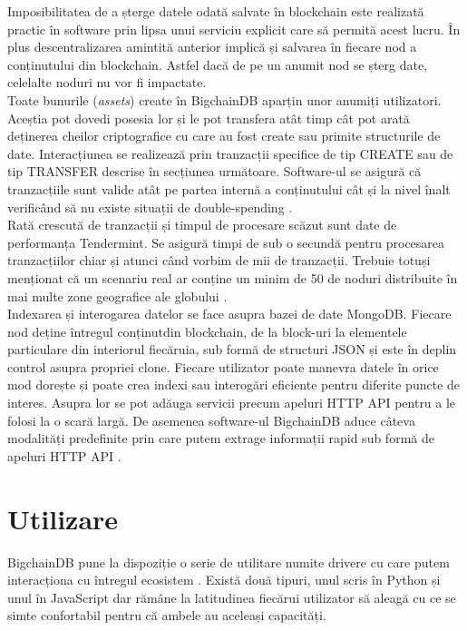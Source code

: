 Imposibilitatea de a șterge datele odată salvate în blockchain este realizată practic în software prin lipsa unui serviciu explicit care să permită acest lucru. În plus descentralizarea amintită anterior implică și salvarea în fiecare nod a conținutului din blockchain. Astfel dacă de pe un anumit nod se șterg date, celelalte noduri nu vor fi impactate.\\

Toate bunurile (\textit{assets}) create în BigchainDB aparțin unor anumiți utilizatori. Aceștia pot dovedi posesia lor și le pot transfera atât timp cât pot arată deținerea cheilor criptografice cu care au fost create sau primite structurile de date. Interacțiunea se realizează prin tranzacții specifice de tip CREATE sau de tip TRANSFER descrise în secțiunea următoare. Software-ul se asigură că tranzacțiile sunt valide atât pe partea internă a conținutului cât și la nivel înalt verificând să nu existe situații de double-spending \cite{BigchainDB_Art}.\\

Rată crescută de tranzacții și timpul de procesare scăzut sunt date de performanța Tendermint. Se asigură timpi de sub o secundă pentru procesarea tranzacțiilor chiar și atunci când vorbim de mii de tranzacții. Trebuie totuși menționat că un scenariu real ar conține un minim de 50 de noduri distribuite în mai multe zone geografice ale globului \cite{BigchainDB_Art}.\\

Indexarea și interogarea datelor se face asupra bazei de date MongoDB. Fiecare nod deține întregul conținutdin blockchain, de la block-uri la elementele particulare din interiorul fiecăruia, sub formă de structuri JSON și este în deplin control asupra propriei clone. Fiecare utilizator poate manevra datele în orice mod dorește și poate crea indexi sau interogări eficiente pentru diferite puncte de interes. Asupra lor se pot adăuga servicii precum apeluri HTTP API pentru a le folosi la o scară largă. De asemenea software-ul BigchainDB aduce câteva modalități predefinite prin care putem extrage informații rapid sub formă de apeluri HTTP API \cite{BigchainDB_Art}.\\

\clearpage

\section{Utilizare}

BigchainDB pune la dispoziție o serie de utilitare numite drivere cu care putem interacționa cu întregul ecosistem \cite{BigchainDB_Docs}. Există două tipuri, unul scris în Python \cite{BigchainDB_PythonDriver} și unul în JavaScript \cite{BigchainDB_JSDriver} dar rămâne la latitudinea fiecărui utilizator să aleagă cu ce se simte confortabil pentru că ambele au aceleași capacități.\\


